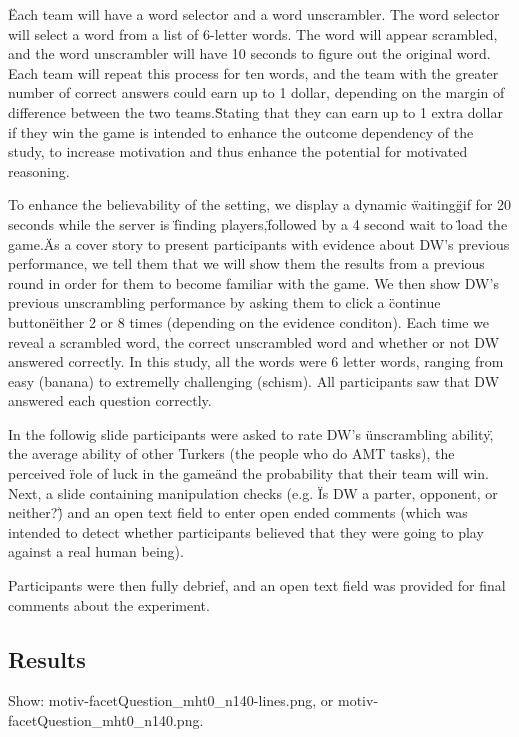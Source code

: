 \documentclass{article} \usepackage{apacite} \usepackage{graphicx} \usepackage{listings}
\begin{document}
\"Each team will have a word selector and a word unscrambler. The word selector will select a word from a list of 6-letter words. The word will appear scrambled, and the word unscrambler will have 10 seconds to figure out the original word. Each team will repeat this process for ten words, and the team with the greater number of correct answers could earn up to 1 dollar, depending on the margin of difference between the two teams.\"

Stating that they can earn up to 1 extra dollar if they win the game is intended to enhance the outcome dependency of the study, to increase motivation and thus enhance the potential for motivated reasoning. 

To enhance the believability of the setting, we display a dynamic \"waiting\" gif for 20 seconds while the server is \"finding players,\" followed by a 4 second wait to \"load the game.\" As a cover story to present participants with evidence about DW's previous performance, we tell them that we will show them the results from a previous round in order for them to become familiar with the game. We then show DW's previous unscrambling performance by asking them to click a \"continue button\" either 2 or 8 times (depending on the evidence conditon). Each time we reveal a scrambled word, the correct unscrambled word and whether or not DW answered correctly. In this study, all the words were 6 letter words, ranging from easy (banana) to extremelly challenging (schism). All participants saw that DW answered each question correctly.

In the followig slide participants were asked to rate DW's \"unscrambling ability\", the average ability of other Turkers (the people who do AMT tasks), the perceived \"role of luck in the game\" and the probability that their team will win. Next, a slide containing manipulation checks (e.g. \"Is DW a parter, opponent, or neither?\") and an open text field to enter open ended comments (which was intended to detect whether participants believed that they were going to play against a real human being).


Participants were then fully debrief, and an open text field was provided for final comments about the experiment. 




\subsection{Results}

Show: motiv-facetQuestion_mht0_n140-lines.png, or motiv-facetQuestion_mht0_n140.png.
\end{document}
